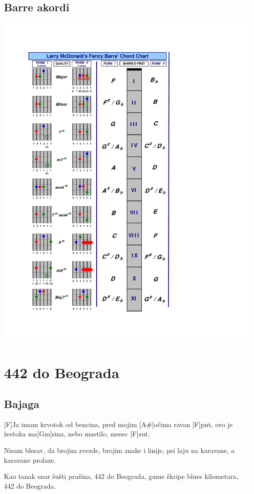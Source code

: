 \documentclass[a4paper,12pt]{article}
\begin{document}
\begin{multicols}{2}
\subsection*{Barre akordi}
\includegraphics[width=140mm]{img/barre.png}
\clearpage
\section{442 do Beograda}
\subsection*{Bajaga}
\begin{guitar}
[F A# 	F  Gm Gm F 2x]

[F]Ja imam krvotok od bencina,
pred mojim [A#]očima ravan [F]put,
ovo je žestoka ma[Gm]sina,
nebo mastilo, mesec [F]zut.

Nisam blesav, da brojim zvezde,
brojim znake i linije,
psi laju na karavane,
a karavane prolaze.

Kao tanak snar šušti prašina,
442 do Beograda,
gume škripe blues kilometara,
442 do Beograda.


\end{guitar}
\end{multicols}
\end{document}

